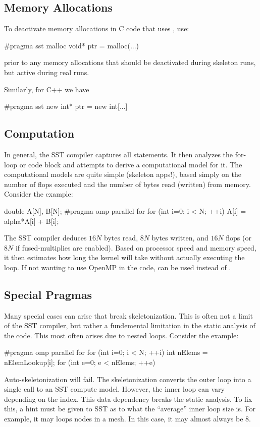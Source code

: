 \subsection{Memory Allocations}
To deactivate memory allocations in C code that uses , use:
\begin{CppCode}
#pragma sst malloc
  void* ptr = malloc(...)
\end{CppCode}
prior to any memory allocations that should be deactivated during skeleton runs, but active during real runs.

Similarly, for C++ we have
\begin{CppCode}
#pragma sst new
  int* ptr = new int[...]
\end{CppCode}

\subsection{Computation}
In general, the SST compiler captures all  statements.
It then analyzes the for-loop or code block and attempts to derive a computational model for it.
The computational models are quite simple (skeleton apps!), 
based simply on the number of flops executed and the number of bytes read (written) from memory.
Consider the example:

\begin{CppCode}
double A[N], B[N];
#pragma omp parallel for
for (int i=0; i < N; ++i){
  A[i] = alpha*A[i] + B[i];
}
\end{CppCode}
The SST compiler deduces $16N$ bytes read, $8N$ bytes written, and $16N$ flops (or $8N$ if fused-multiplies are enabled).
Based on processor speed and memory speed, it then estimates how long the kernel will take without actually executing the loop.
If not wanting to use OpenMP in the code,  can be used instead of .


\subsection{Special Pragmas}
Many special cases can arise that break skeletonization.
This is often not a limit of the SST compiler, but rather a fundemental limitation in the static analysis of the code.
This most often arises due to nested loops. Consider the example:

\begin{CppCode}
#pragma omp parallel for
for (int i=0; i < N; ++i){
  int nElems = nElemLookup[i];
  for (int e=0; e < nElems; ++e){
  }
}
\end{CppCode}
Auto-skeletonization will fail. The skeletonization converts the outer loop into a single call to an SST compute model.
However, the inner loop can vary depending on the index.
This data-dependency breaks the static analysis.
To fix this, a hint must be given to SST as to what the ``average'' inner loop size is.
For example, it may loops nodes in a mesh. In this case, it may almost always be 8.

